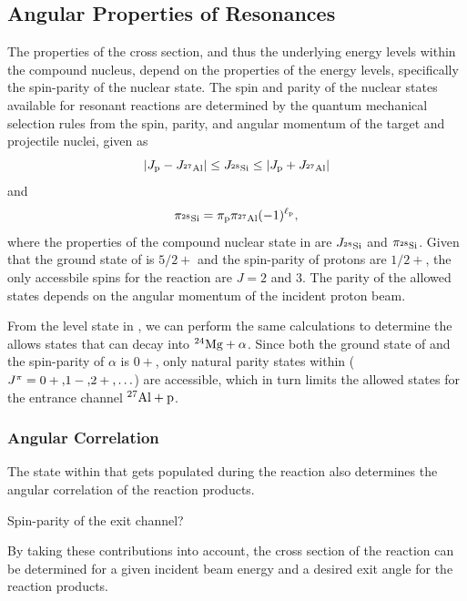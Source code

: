 \subsection{Angular Properties of Resonances}

The properties of the cross section, and thus the underlying energy levels
within the compound nucleus, depend on the properties of the energy levels,
specifically the spin-parity of the nuclear state. The spin and parity of the
nuclear states available for resonant reactions are determined by the quantum
mechanical selection rules from the spin, parity, and angular momentum of the
target and projectile nuclei, given as
\[
    \left|J_{\rm{p}} - J_{{}^{27}\textrm{Al}}\right|
    \leq J_{{}^{28}\textrm{Si}} \leq
    \left|J_{\rm{p}} + J_{{}^{27}\textrm{Al}}\right|
\]
and
\[
    \pi_{{}^{28}\textrm{Si}} = \pi_{\rm{p}}\pi_{{}^{27}\textrm{Al}}(-1)^{\ell_{\rm{p}}},
\]
where the properties of the compound nuclear state in  are
$J_{{}^{28}\textrm{Si}}$ and $\pi_{{}^{28}\textrm{Si}}$. Given that the ground state of
 is $5/2+$ and the spin-parity of protons are $1/2+$, the only
accessbile spins for the reaction are $J = 2$ and $3$. The parity of the
allowed states depends on the angular momentum of the incident proton beam.

From the level state in , we can perform the same calculations to
determine the allows states that can decay into ${}^{24}\textrm{Mg} + \alpha$. Since
both the ground state of  and the spin-parity of $\alpha$ is $0+$,
only natural parity states within 
($J^{\pi} = 0+\rm{, }1-\rm{, }2+\rm{, }\ldots$) are accessible, which in turn
limits the allowed states for the entrance channel ${}^{27}\textrm{Al} + \rm{p}$.


\subsubsection{Angular Correlation}
The state within  that gets populated during the reaction also
determines the angular correlation of the reaction products.

Spin-parity of the exit channel?

By taking these contributions into account, the cross section of the reaction
can be determined for a given incident beam energy and a desired exit angle for
the reaction products.

